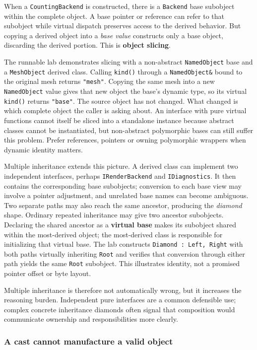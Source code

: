 When a \texttt{CountingBackend} is constructed, there is a \texttt{Backend} base subobject within the complete object. A base pointer or reference can refer to that subobject while virtual dispatch preserves access to the derived behavior. But copying a derived object into a \emph{base value} constructs only a base object, discarding the derived portion. This is \textbf{object slicing}.

The runnable lab demonstrates slicing with a non-abstract \texttt{NamedObject} base and a \texttt{MeshObject} derived class. Calling \texttt{kind()} through a \texttt{NamedObject\&} bound to the original mesh returns \texttt{"mesh"}. Copying the same mesh into a new \texttt{NamedObject} value gives that new object the base's dynamic type, so its virtual \texttt{kind()} returns \texttt{"base"}. The source object has not changed. What changed is which complete object the caller is asking about. An interface with pure virtual functions cannot itself be sliced into a standalone instance because abstract classes cannot be instantiated, but non-abstract polymorphic bases can still suffer this problem. Prefer references, pointers or owning polymorphic wrappers when dynamic identity matters.

Multiple inheritance extends this picture. A derived class can implement two independent interfaces, perhaps \texttt{IRenderBackend} and \texttt{IDiagnostics}. It then contains the corresponding base subobjects; conversion to each base view may involve a pointer adjustment, and unrelated base names can become ambiguous. Two separate paths may also reach the same ancestor, producing the \emph{diamond} shape. Ordinary repeated inheritance may give two ancestor subobjects. Declaring the shared ancestor as a \textbf{virtual base} makes its subobject shared within the most-derived object; the most-derived class is responsible for initializing that virtual base. The lab constructs \texttt{Diamond\ :\ Left,\ Right} with both paths virtually inheriting \texttt{Root} and verifies that conversion through either path yields the same \texttt{Root} subobject. This illustrates identity, not a promised pointer offset or byte layout.

Multiple inheritance is therefore not automatically wrong, but it increases the reasoning burden. Independent pure interfaces are a common defensible use; complex concrete inheritance diamonds often signal that composition would communicate ownership and responsibilities more clearly.

\subsubsection{A cast cannot manufacture a valid object}\label{a-cast-cannot-manufacture-a-valid-object}

